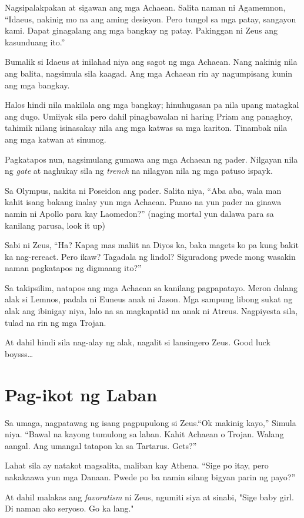 \documentclass[12pt,letterpaper]{report}
\begin{document}
Nagsipalakpakan at sigawan ang mga Achaean. Salita naman ni Agamemnon, ``Idaeus, nakinig mo na ang aming desisyon. Pero tungol sa mga patay, sangayon kami. Dapat ginagalang ang mga bangkay ng patay. Pakinggan ni Zeus ang kasunduang ito.''

Bumalik si Idaeus at inilahad niya ang sagot ng mga Achaean. Nang nakinig nila ang balita, nagsimula sila kaagad. Ang mga Achaean rin ay nagumpisang kunin ang mga bangkay.

Halos hindi nila makilala ang mga bangkay; hinuhugasan pa nila upang matagkal ang dugo. Umiiyak sila pero dahil pinagbawalan ni haring Priam ang panaghoy, tahimik nilang isinasakay nila ang mga katwas sa mga kariton. Tinambak nila ang mga katwan at sinunog.

Pagkatapos nun, nagsimulang gumawa ang mga Achaean ng pader. Nilgayan nila ng \textit{gate} at naghukay sila ng \textit{trench} na nilagyan nila ng mga patuso ispayk.

Sa Olympus, nakita ni Poseidon ang pader. Salita niya, ``Aba aba, wala man kahit isang bakang inalay yun mga Achaean. Paano na yun pader na ginawa namin ni Apollo para kay Laomedon?'' (naging mortal yun dalawa para sa kanilang parusa, look it up)

Sabi ni Zeus, ``Ha? Kapag mas maliit na Diyos ka, baka magets ko pa kung bakit ka nag-rereact. Pero ikaw? Tagadala ng lindol? Siguradong pwede mong wasakin naman pagkatapos ng digmaang ito?''

Sa takipsilim, natapos ang mga Achaean sa kanilang pagpapatayo. Meron dalang alak si Lemnos, padala ni Euneus anak ni Jason. Mga sampung libong sukat ng alak ang ibinigay niya, lalo na sa magkapatid na anak ni Atreus. Nagpiyesta sila, tulad na rin ng mga Trojan.

At dahil hindi sila nag-alay ng alak, nagalit si lansingero Zeus. Good luck boysss\dots
\pagebreak
\chapter{Pag-ikot ng Laban}
Sa umaga, nagpatawag ng isang pagpupulong si Zeus.``Ok makinig kayo,'' Simula niya. ``Bawal na kayong tumulong sa laban. Kahit Achaean o Trojan. Walang aangal. Ang umangal tatapon ka sa Tartarus. Gets?''

Lahat sila ay natakot magsalita, maliban kay Athena. ``Sige po itay, pero nakakaawa yun mga Danaan. Pwede po ba namin silang bigyan parin ng payo?''

At dahil malakas ang \textit{favoratism} ni Zeus, ngumiti siya at sinabi, "Sige baby girl. Di naman ako seryoso. Go ka lang."
\end{document}
